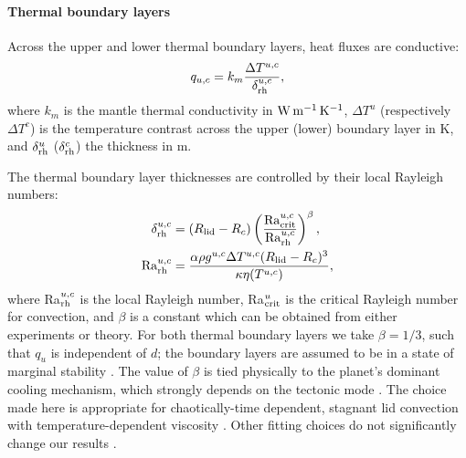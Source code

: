 \documentclass[trackchanges]{aastex63}
\begin{document}

\paragraph{Thermal boundary layers} Across the upper and lower thermal boundary layers, heat fluxes are conductive:
\begin{equation}
    q_{u, c} = k_m \frac{\Delta T^{u, c}}{\delta^{u, c}_{\rm rh}}, \label{eq:q_u}
\end{equation}
where $k_m$ is the mantle thermal conductivity in $\rm{W\,m^{-1}\,K^{-1}}$, $\Delta T^u$ (respectively $\Delta T^c$) is the temperature contrast across the upper (lower) boundary layer in K, and $\delta^{u}_{\rm rh}$ ($\delta^{c}_{\rm rh}$) the thickness in m. 

The thermal boundary layer thicknesses are controlled by their local Rayleigh numbers:
\begin{align}
\delta^{u, c}_{\rm rh} &= (R_{\rm lid} - R_c) \left(\frac{{\rm Ra}^{u, c}_{{\rm crit}}}{{\rm Ra}^{u, c}_{{\rm rh}}}\right)^\beta,  \label{eq:d_u}\\ 
{\rm Ra}^{u, c}_{{\rm rh}} &= \frac{\alpha\rho g^{u, c} \Delta T^{u, c} (R_{\rm lid} - R_c)^3}{\kappa \eta(T^{u, c})}, \label{eq:Ra_rh}
\end{align}
where Ra$^{u, c}_{{\rm rh}}$ is the local Rayleigh number, Ra$^u_{{\rm crit}}$ is the critical Rayleigh number for convection, and $\beta$ is a constant which can be obtained from either experiments or theory. For both thermal boundary layers we take $\beta = 1/3$, such that $q_u$ is independent of $d$; the boundary layers are assumed to be in a state of marginal stability \citep[e.g.,][]{solomatov_scaling_1995}. The value of $\beta$ is tied physically to the planet's dominant cooling mechanism, which strongly depends on the tectonic mode \citep{lenardic_diversity_2018, seales_uncertainty_2020}. The choice made here is appropriate for chaotically-time dependent, stagnant lid convection with temperature-dependent viscosity \citep{solomatov_scaling_1995, solomatov_scaling_2000}. Other fitting choices do not significantly change our results \citep{thiriet_scaling_2019}.  %
\end{document}

